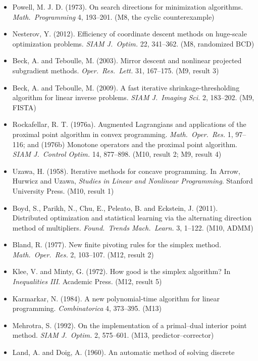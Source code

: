 \documentclass[11pt,a4paper]{article}
\begin{document}
\begin{itemize}[label={}]
optimization. \emph{ICML}. \hfill (M8, result 2)
\item[{[C14]}] Powell, M. J. D. (1973). On search directions for minimization algorithms.
\emph{Math.\ Programming} 4, 193--201. \hfill (M8, the cyclic counterexample)
\item[{[C15]}] Nesterov, Y. (2012). Efficiency of coordinate descent methods on huge-scale
optimization problems. \emph{SIAM J.\ Optim.} 22, 341--362. \hfill (M8, randomized BCD)
\item[{[C16]}] Beck, A. and Teboulle, M. (2003). Mirror descent and nonlinear projected
subgradient methods. \emph{Oper.\ Res.\ Lett.} 31, 167--175. \hfill (M9, result 3)
\item[{[C17]}] Beck, A. and Teboulle, M. (2009). A fast iterative shrinkage-thresholding
algorithm for linear inverse problems. \emph{SIAM J.\ Imaging Sci.} 2, 183--202.
\hfill (M9, FISTA)
\item[{[C18]}] Rockafellar, R. T. (1976a). Augmented Lagrangians and applications of the
proximal point algorithm in convex programming. \emph{Math.\ Oper.\ Res.} 1, 97--116; and
(1976b) Monotone operators and the proximal point algorithm. \emph{SIAM J.\ Control Optim.}
14, 877--898. \hfill (M10, result 2; M9, result 4)
\item[{[C19]}] Uzawa, H. (1958). Iterative methods for concave programming. In Arrow, Hurwicz
and Uzawa, \emph{Studies in Linear and Nonlinear Programming}. Stanford University Press.
\hfill (M10, result 1)
\item[{[C20]}] Boyd, S., Parikh, N., Chu, E., Peleato, B. and Eckstein, J. (2011). Distributed
optimization and statistical learning via the alternating direction method of multipliers.
\emph{Found.\ Trends Mach.\ Learn.} 3, 1--122. \hfill (M10, ADMM)
\item[{[C21]}] Bland, R. (1977). New finite pivoting rules for the simplex method.
\emph{Math.\ Oper.\ Res.} 2, 103--107. \hfill (M12, result 2)
\item[{[C22]}] Klee, V. and Minty, G. (1972). How good is the simplex algorithm? In
\emph{Inequalities III}. Academic Press. \hfill (M12, result 5)
\item[{[C23]}] Karmarkar, N. (1984). A new polynomial-time algorithm for linear programming.
\emph{Combinatorica} 4, 373--395. \hfill (M13)
\item[{[C24]}] Mehrotra, S. (1992). On the implementation of a primal--dual interior point
method. \emph{SIAM J.\ Optim.} 2, 575--601. \hfill (M13, predictor--corrector)
\item[{[C25]}] Land, A. and Doig, A. (1960). An automatic method of solving discrete

\end{itemize}
\end{document}
